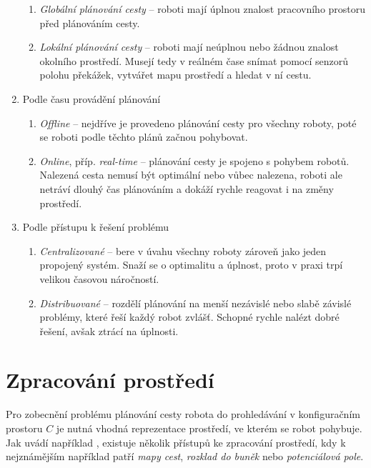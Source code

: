 \begin{enumerate}
\begin{enumerate}
		\item \emph{Globální plánování cesty} -- roboti mají úplnou znalost pracovního prostoru před plánováním cesty.
		\item \emph{Lokální plánování cesty} -- roboti mají neúplnou nebo žádnou znalost okolního prostředí. Musejí tedy v reálném čase snímat pomocí senzorů polohu překážek, vytvářet mapu prostředí a hledat v ní cestu.
	\end{enumerate}
	\item Podle času provádění plánování
	\begin{enumerate}
		\item \emph{Offline} -- nejdříve je provedeno plánování cesty pro všechny roboty, poté se roboti podle těchto plánů začnou pohybovat.
		\item \emph{Online}, příp. \emph{real-time} -- plánování cesty je spojeno s pohybem robotů. Nalezená cesta nemusí být optimální nebo vůbec nalezena, roboti ale netráví dlouhý čas plánováním a dokáží rychle reagovat i na změny prostředí.
	\end{enumerate}
	\item Podle přístupu k řešení problému
	\begin{enumerate}
		\item \emph{Centralizované} -- bere v úvahu všechny roboty zároveň jako jeden propojený systém. Snaží se o optimalitu a úplnost, proto v praxi trpí velikou časovou náročností.
		\item \emph{Distribuované} -- rozdělí plánování na menší nezávislé nebo slabě závislé problémy, které řeší každý robot zvlášť. Schopné rychle nalézt dobré řešení, avšak ztrácí na úplnosti.
	\end{enumerate}
\end{enumerate}

\section{Zpracování prostředí}
Pro zobecnění problému plánování cesty robota do prohledávání v konfiguračním prostoru $C$ je nutná vhodná reprezentace prostředí, ve kterém se robot pohybuje. Jak uvádí například \cite{LaValle2006,Masehian2007}, existuje několik přístupů ke zpracování prostředí, kdy k nejznámějším například patří \textit{mapy cest}, \textit{rozklad do buněk} nebo \textit{potenciálová pole}.

